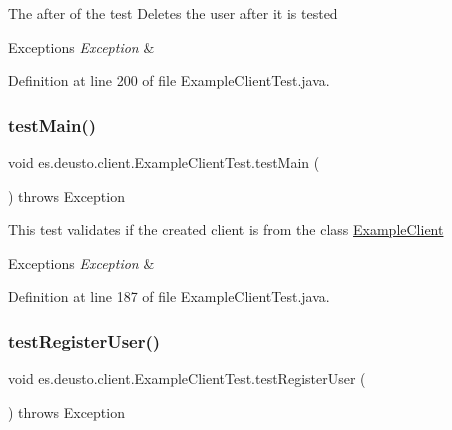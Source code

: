 The after of the test Deletes the user after it is tested 
\begin{DoxyExceptions}{Exceptions}
{\em Exception} & \\
\hline
\end{DoxyExceptions}


Definition at line 200 of file Example\+Client\+Test.\+java.

\mbox{\label{classes_1_1deusto_1_1client_1_1_example_client_test_a6d89c8424397bc3fef01913b98fb79ef}} 
\subsubsection{\texorpdfstring{test\+Main()}{testMain()}}
{\footnotesize\ttfamily void es.\+deusto.\+client.\+Example\+Client\+Test.\+test\+Main (\begin{DoxyParamCaption}{ }\end{DoxyParamCaption}) throws Exception}

This test validates if the created client is from the class \hyperlink{classes_1_1deusto_1_1client_1_1_example_client}{Example\+Client} 
\begin{DoxyExceptions}{Exceptions}
{\em Exception} & \\
\hline
\end{DoxyExceptions}


Definition at line 187 of file Example\+Client\+Test.\+java.

\mbox{\label{classes_1_1deusto_1_1client_1_1_example_client_test_a59d9c8bd0d8d85e0b0ded16ef0f9cb85}} 
\subsubsection{\texorpdfstring{test\+Register\+User()}{testRegisterUser()}}
{\footnotesize\ttfamily void es.\+deusto.\+client.\+Example\+Client\+Test.\+test\+Register\+User (\begin{DoxyParamCaption}{ }\end{DoxyParamCaption}) throws Exception}

